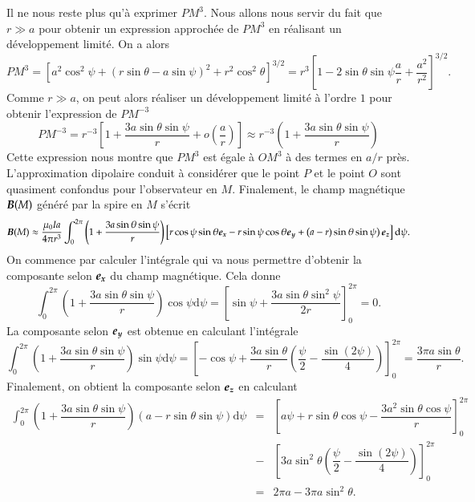 	Il ne nous reste plus qu'à exprimer $PM^3$. Nous allons nous servir du
	fait que $r \gg a$ pour obtenir un expression approchée de $PM^3$ en 
	réalisant un développement limité. On a alors
	\begin{equation*}
		PM^3 = \left[a^2\cos^2\psi + \left(r \sin \theta - a\sin \psi\right)^2 
		+ r^2 \cos^2 \theta \right]^{3/2}
		= r^3 \left[ 1 - 2\sin \theta \sin \psi \dfrac{a}{r} + \dfrac{a^2}{r^2}
		\right]^{3/2}.
	\end{equation*}
	Comme $r \gg a$, on peut alors réaliser un développement limité à l'ordre $1$
	pour obtenir l'expression de $PM^{-3}$
	\begin{equation*}
		PM^{-3} = r^{-3}\left[1 + \dfrac{3a\sin\theta\sin\psi}{r} +
		          o\left(\dfrac{a}{r}\right)\right] \approx
			  r^{-3} \left(1 + \dfrac{3a\sin\theta\sin\psi}{r}\right)
	\end{equation*}
	Cette expression nous montre que $PM^3$ est égale à $OM^3$ à des termes en
	$a/r$ près. L'approximation dipolaire conduit à considérer que le point $P$
	et le point $O$ sont quasiment confondus pour l'observateur en $M$.
	Finalement, le champ magnétique $\vecb(M)$ généré par la spire en $M$
	s'écrit
	\begin{equation*}
		\vecb(M) \approx \dfrac{\mu_0 Ia}{4 \pi r^3}
		\int_0^{2\pi}\left(1 + \dfrac{3a\sin\theta\sin\psi}{r}\right)
		\left[r \cos\psi\sin\theta\ex -r\sin\psi\cos\theta\ey
		+ \left(a -r)\sin\theta\sin\psi\right)\ez\right]\mathrm{d}\psi.
	\end{equation*}
	On commence par calculer l'intégrale qui va nous permettre d'obtenir la composante
	selon $\ex$ du champ magnétique. Cela donne
	\begin{equation*}
		\int_0^{2\pi} \left(1 + \dfrac{3a \sin\theta\sin\psi}{r}\right)
		\cos\psi \mathrm{d}\psi = \left[\sin \psi + 
		\dfrac{3a\sin\theta\sin^2\psi}{2r} \right]^{2\pi}_0 = 0.
	\end{equation*}
	La composante selon $\ey$ est obtenue en calculant l'intégrale
	\begin{equation*}
		\int_0^{2\pi} \left(1 + \dfrac{3a \sin\theta\sin\psi}{r}\right)
		\sin \psi \mathrm{d}\psi = \left[-\cos \psi + 
			\dfrac{3a\sin\theta}{r}\left(\dfrac{\psi}{2}
			- \dfrac{\sin(2\psi)}{4}\right) \right]^{2\pi}_0 =
			\dfrac{3 \pi a \sin \theta}{r}.
	\end{equation*}
	Finalement, on obtient la composante selon $\ez$ en calculant
	\begin{equation*}
		\begin{array}{rcl}
		\displaystyle \int^{2\pi}_0 \left(1 + \dfrac{3a \sin\theta\sin\psi}
		{r}\right)
		\left(a - r\sin\theta\sin\psi \right)\mathrm{d}{\psi}
		&=& \left[ a \psi + r\sin\theta\cos\psi - 
		\dfrac{3a^2\sin\theta\cos\psi}{r}\right]^{2\pi}_{0} \\ 
		&-& \left[3a\sin^2\theta
		\left(\dfrac{\psi}{2} - \dfrac{\sin(2\psi)}{4}\right)
	\right]^{2\pi}_0 \\[1.5em]
		&=& 2\pi a - 3\pi a \sin^2\theta.
		\end{array}
	\end{equation*}
